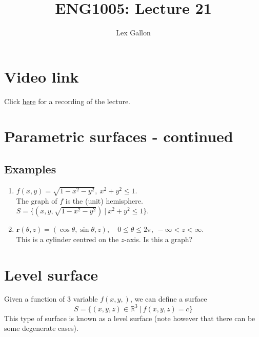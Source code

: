 \documentclass[11pt]{article}
\newcommand{\reals}{\mathbb{R}}
\renewcommand{\vec}[1]{\mathbf{#1}}
\begin{document}
\title{ENG1005: Lecture 21}
\author{Lex Gallon}
\maketitle

\tableofcontents

\section*{Video link}
Click \href{https://echo360.org.au/lesson/G_35fe23e0-41ee-4e6f-b0f5-05f4155bb7b0_b944cecf-8ba5-40d3-a870-0243a0a9e78c_2020-05-07T15:58:00.000_2020-05-07T16:53:00.000/classroom#sortDirection=desc}{here} for a recording of the lecture.

\section{Parametric surfaces - continued}
\subsection{Examples}
\begin{enumerate}[ (a) ]
\item $f(x,y) = \sqrt{1 - x^2 - y^2},\ x^2 + y^2 \leq 1$.\\
The graph of $f$ is the (unit) hemisphere.\\
$S = \{ (x, y, \sqrt{1 - x^2 - y^2})\ |\ x^2 + y^2 \leq 1 \}$.

\item $\vec{r}(\theta, z) = (\cos \theta, \sin \theta, z),\quad 0 \leq \theta \leq 2\pi,\ -\infty < z < \infty$.\\
This is a cylinder centred on the $z$-axis. Is this a graph?
\end{enumerate}

\section{Level surface}
Given a function of 3 variable $f(x,y,)$, we can define a surface
\[ S = \{ (x, y, z) \in \reals^3\ |\ f(x, y, z) = c \} \]
This type of surface is known as a level surface (note however that there can be some degenerate cases).
\end{document}

